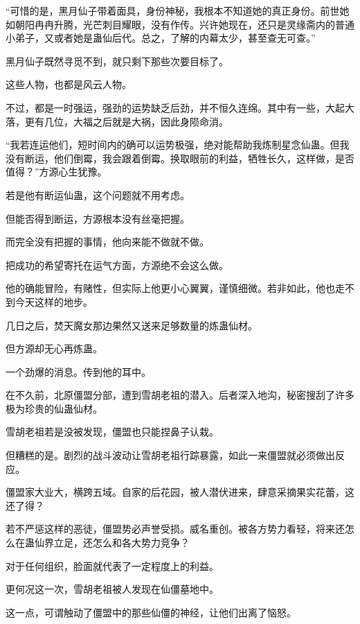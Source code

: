 
\begin{this_body}



“可惜的是，黑月仙子带着面具，身份神秘，我根本不知道她的真正身份。前世她如朝阳冉冉升腾，光芒刺目耀眼，没有作传。兴许她现在，还只是灵缘斋内的普通小弟子，又或者她是蛊仙后代。总之，了解的内幕太少，甚至查无可查。”

黑月仙子既然寻觅不到，就只剩下那些次要目标了。

这些人物，也都是风云人物。

不过，都是一时强运，强劲的运势缺乏后劲，并不恒久连绵。其中有一些，大起大落，更有几位，大福之后就是大祸，因此身陨命消。

“我若连运他们，短时间内的确可以运势极强，绝对能帮助我炼制星念仙蛊。但我没有断运，他们倒霉，我会跟着倒霉。换取眼前的利益，牺牲长久，这样做，是否值得？”方源心生犹豫。

若是他有断运仙蛊，这个问题就不用考虑。

但能否得到断运，方源根本没有丝毫把握。

而完全没有把握的事情，他向来能不做就不做。

把成功的希望寄托在运气方面，方源绝不会这么做。

他的确能冒险，有赌性，但实际上他更小心翼翼，谨慎细微。若非如此，他也走不到今天这样的地步。

几日之后，焚天魔女那边果然又送来足够数量的炼蛊仙材。

但方源却无心再炼蛊。

一个劲爆的消息。传到他的耳中。

在不久前，北原僵盟分部，遭到雪胡老祖的潜入。后者深入地沟，秘密搜刮了许多极为珍贵的仙蛊仙材。

雪胡老祖若是没被发现，僵盟也只能捏鼻子认栽。

但糟糕的是。剧烈的战斗波动让雪胡老祖行踪暴露，如此一来僵盟就必须做出反应。

僵盟家大业大，横跨五域。自家的后花园，被人潜伏进来，肆意采摘果实花蕾，这还了得？

若不严惩这样的恶徒，僵盟势必声誉受损。威名重创。被各方势力看轻，将来还怎么在蛊仙界立足，还怎么和各大势力竞争？

对于任何组织，脸面就代表了一定程度上的利益。

更何况这一次，雪胡老祖被人发现在仙僵墓地中。

这一点，可谓触动了僵盟中的那些仙僵的神经，让他们出离了恼怒。


\end{this_body}
